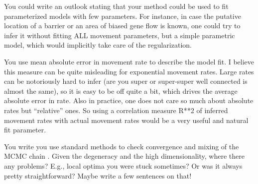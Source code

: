 

\begin{point}{}
    You could write an outlook stating that your method could be used to fit
    parameterized models with few parameters. For instance, in case the putative
    location of a barrier or an area of biased gene flow is known, one could try to
    infer it without fitting ALL movement parameters, but a simple parametric
    model, which would implicitly take care of the regularization.  
\end{point}


\begin{point}{}
    You use mean absolute error in movement rate to describe the model fit. I
    believe this measure can be quite misleading for exponential movement rates.
    Large rates can be notoriously hard to infer (are you super or super-super well
    connected is almost the same), so it is easy to be off quite a bit, which
    drives the average absolute error in rate. Also in practice, one does not care
    so much about absolute rates but ``relative'' ones. So using a correlation
    measure R**2  of inferred movement rates with actual movement rates would be a
    very useful and natural fit parameter.  
\end{point}


\begin{point}{}
    You write you use standard methods to check convergence and mixing of the
    MCMC chain . Given the degeneracy and the high dimensionality,
    where there any problems? E.g., local optima you were stuck sometimes? Or
    was it always pretty straightforward? Maybe write a few sentences on that!
\end{point}

